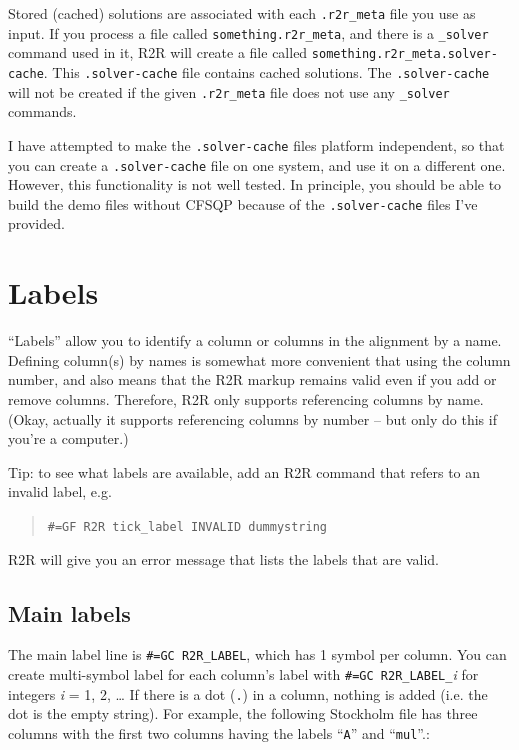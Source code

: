 \documentclass[letterpaper,12pt]{report}
\newcommand{\example}[1]{
\begin{quote}
{\raggedright
#1
}
\end{quote}
}
\begin{document}
Stored (cached) solutions are associated with each {\tt .r2r\_meta} file you use as input.  If you process a file called {\tt something.r2r\_meta}, and there is a {\tt \_solver} command used in it, R2R will create a file called {\tt something.r2r\_meta.solver-cache}. This {\tt .solver-cache} file contains cached solutions.  The {\tt .solver-cache} will not be created if the given {\tt .r2r\_meta} file does not use any {\tt \_solver} commands.

I have attempted to make the {\tt .solver-cache} files platform independent, so that you can create a {\tt .solver-cache} file on one system, and use it on a different one.  However, this functionality is not well tested.  In principle, you should be able to build the demo files without CFSQP because of the {\tt .solver-cache} files I've provided.

\section{Labels}
\label{sec:labels}

``Labels'' allow you to identify a column or columns in the alignment by a name.
Defining column(s) by names is somewhat more convenient that using the column number,
and also means that the R2R markup remains valid even if you add or remove columns.
Therefore, R2R only supports referencing columns by name.  (Okay, actually it supports referencing columns by number -- but only do this if you're a computer.)

Tip: to see what labels are available, add an R2R command that refers to an invalid label, e.g.

\example{{\tt \#=GF R2R tick\_label INVALID dummystring}}

R2R will give you an error message that lists the labels that are valid.

\subsection{Main labels}

The main label line is {\tt \#=GC R2R\_LABEL}, which has 1 symbol per
column.  You can create multi-symbol label for each column{\textquoteright}s label
with {\tt \#=GC R2R\_LABEL\_}\textit{i} for integers \textit{i} = 1, 2,
{\dots} If there is a dot ({\tt .}) in a
column, nothing is added (i.e. the dot is the empty string).
For example, the following Stockholm file has three columns with the first two
columns having the labels
``{\tt A}'' and
 ``{\tt mul}''.:
\end{document}
